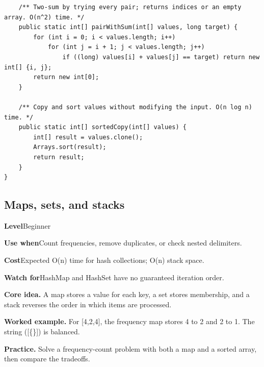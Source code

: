 \documentclass[10pt,letterpaper]{article}
\newcommand{\entrylabel}[1]{\textcolor{accent}{\bfseries #1}}
\begin{document}
\begin{lstlisting}
    /** Two-sum by trying every pair; returns indices or an empty array. O(n^2) time. */
    public static int[] pairWithSum(int[] values, long target) {
        for (int i = 0; i < values.length; i++)
            for (int j = i + 1; j < values.length; j++)
                if ((long) values[i] + values[j] == target) return new int[] {i, j};
        return new int[0];
    }

    /** Copy and sort values without modifying the input. O(n log n) time. */
    public static int[] sortedCopy(int[] values) {
        int[] result = values.clone();
        Arrays.sort(result);
        return result;
    }
}
\end{lstlisting}
\subsection{Maps, sets, and stacks}
\begin{guidebox}\small
\entrylabel{Level}\quad Beginner\par
\entrylabel{Use when}\quad Count frequencies, remove duplicates, or check nested delimiters.\par
\entrylabel{Cost}\quad Expected O(n) time for hash collections; O(n) stack space.\par
\entrylabel{Watch for}\quad HashMap and HashSet have no guaranteed iteration order.\par
\end{guidebox}
\noindent\textbf{Core idea.} A map stores a value for each key, a set stores membership, and a stack reverses the order in which items are processed.\par
\noindent\textbf{Worked example.} For [4,2,4], the frequency map stores 4 to 2 and 2 to 1. The string ([\{\}]) is balanced.\par
\noindent\textbf{Practice.} Solve a frequency-count problem with both a map and a sorted array, then compare the tradeoffs.\par
\end{document}
